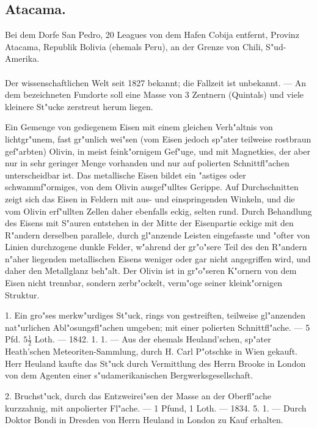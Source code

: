 \documentclass[a4paper, 11pt, oneside, polutonikogreek, german]{article}
\begin{document}
\subsection[--- Meteoreisen --- Nr. 70 bis 94. --- Atacama.]{Atacama.}
\begin{center}
\small
Bei dem Dorfe San Pedro, 20 Leagues von dem Hafen Cobija entfernt, Provinz Atacama, Republik Bolivia (ehemals Peru), an der Grenze von Chili, S"ud-Amerika.
\end{center}
\paragraph{}
Der wissenschaftlichen Welt seit 1827 bekannt; die Fallzeit ist unbekannt. --- An dem bezeichneten Fundorte soll eine Masse von 3 Zentnern (Quintals) und viele kleinere St"ucke zerstreut herum liegen.

Ein Gemenge von gediegenem Eisen mit einem gleichen Verh"altnis von lichtgr"unem, fast gr"unlich wei"sen (vom Eisen jedoch sp"ater teilweise rostbraun gef"arbten) Olivin, in meist feink"ornigem Gef"uge, und mit Magnetkies, der aber nur in sehr geringer Menge vorhanden und nur auf polierten Schnittfl"achen unterscheidbar ist. Das metallische Eisen bildet ein "astiges oder schwammf"ormiges, von dem Olivin ausgef"ulltes Gerippe. Auf Durchschnitten zeigt sich das Eisen in Feldern mit aus- und einspringenden Winkeln, und die vom Olivin erf"ullten Zellen daher ebenfalls eckig, selten rund. Durch Behandlung des Eisens mit S"auren entstehen in der Mitte der Eisenpartie eckige mit den R"andern derselben parallele, durch gl"anzende Leisten eingefasste und "ofter von Linien durchzogene dunkle Felder, w"ahrend der gr"o"sere Teil des den R"andern n"aher liegenden metallischen Eisens weniger oder gar nicht angegriffen wird, und daher den Metallglanz beh"alt. Der Olivin ist in gr"o"seren K"ornern von dem Eisen nicht trennbar, sondern zerbr"ockelt, verm"oge seiner kleink"ornigen Struktur.

1. Ein gro"ses merkw"urdiges St"uck, rings von gestreiften, teilweise gl"anzenden nat"urlichen Abl"osungsfl"achen umgeben; mit einer polierten Schnittfl"ache. --- 5 Pfd. $5\frac{1}{2}$ Loth. --- 1842. 1. 1. --- Aus der ehemals Heuland'schen, sp"ater Heath'schen Meteoriten-Sammlung, durch H. Carl P"otschke in Wien gekauft. Herr Heuland kaufte das St"uck durch Vermittlung des Herrn Brooke in London von dem Agenten einer s"udamerikanischen Bergwerksgesellschaft.

2. Bruchst"uck, durch das Entzweirei"sen der Masse an der Oberfl"ache kurzzahnig, mit anpolierter Fl"ache. --- 1 Pfund, 1 Loth. --- 1834. 5. 1. --- Durch Doktor Bondi in Dresden von Herrn Heuland in London zu Kauf erhalten.
\end{document}
